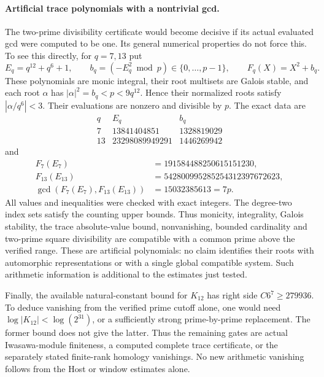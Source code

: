 \paragraph{Artificial trace polynomials with a nontrivial gcd.}
The two-prime divisibility certificate would become decisive if its
actual evaluated gcd were computed to be one.  Its general numerical
properties do not force this.  To see this directly, for $q=7,13$
put
\[
 E_q=q^{12}+q^6+1,\qquad
 b_q=(-E_q^2\bmod p)\in\{0,\ldots,p-1\},\qquad
 F_q(X)=X^2+b_q.
 \tag{HU.10}
\]
These polynomials are monic integral, their root multisets are
Galois stable, and each root $\alpha$ has
$|\alpha|^2=b_q<p<9q^{12}$.  Hence their normalized roots satisfy
$|\alpha/q^6|<3$.  Their evaluations are nonzero and divisible by
$p$.  The exact data are
\[
 \begin{array}{c|r|r}
 q&E_q&b_q\\ \hline
 7&13841404851&1328819029\\
 13&23298089949291&1446269942
 \end{array}
\]
and
\[
 \begin{split}
 F_7(E_7)&=191584488250615151230,\\
 F_{13}(E_{13})&=542800995285254312397672623,\\
 \gcd(F_7(E_7),F_{13}(E_{13}))
       &=15032385613=7p.
 \end{split}
 \tag{HU.11}
\]
All values and inequalities were checked with exact integers.
The degree-two index sets satisfy the counting upper bounds.
Thus monicity, integrality, Galois stability, the trace
absolute-value bound, nonvanishing, bounded cardinality and
two-prime square divisibility are compatible with a common prime
above the verified range.  These are artificial polynomials:
no claim identifies their roots with automorphic representations
or with a single global compatible system.  Such arithmetic
information is additional to the estimates just tested.

Finally, the available natural-constant bound for $K_{12}$ has
right side $C6^7\ge279936$.  To deduce vanishing from the
verified prime cutoff alone, one would need
$\log|K_{12}|<\log(2^{31})$, or a sufficiently strong
prime-by-prime replacement.  The former bound does not give the
latter.  Thus the remaining gates are actual Iwasawa-module
finiteness, a computed complete trace certificate, or the
separately stated finite-rank homology vanishings.  No new
arithmetic vanishing follows from the Host or window estimates
alone.
